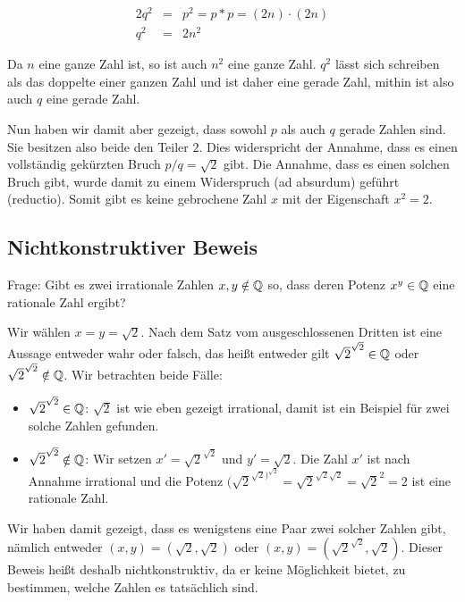 \begin{eqnarray}
	2q^2 & = & p^2 = p * p = (2n) \cdot (2n) \\
	q^2 & = & 2 n^2
\end{eqnarray}
	
Da $n$ eine ganze Zahl ist, so ist auch $n^2$ eine ganze Zahl. $q^2$ lässt sich schreiben als das doppelte einer ganzen Zahl und ist daher eine gerade Zahl, mithin ist also auch $q$ eine gerade Zahl.

Nun haben wir damit aber gezeigt, dass sowohl $p$ als auch $q$ gerade Zahlen sind. Sie besitzen also beide den Teiler $2$. Dies widerspricht der Annahme, dass es einen vollständig gekürzten Bruch $p / q = \sqrt{2}$ gibt. Die Annahme, dass es einen solchen Bruch gibt, wurde damit zu einem Widerspruch (ad absurdum) geführt (reductio). Somit gibt es keine gebrochene Zahl $x$ mit der Eigenschaft $x^2=2$.

\subsection{Nichtkonstruktiver Beweis}

Frage: Gibt es zwei irrationale Zahlen $x,y\notin \mathbb{Q}$ so, dass deren Potenz $x^y\in \mathbb{Q}$ eine rationale Zahl ergibt?

Wir wählen $x=y=\sqrt{2}$. Nach dem Satz vom ausgeschlossenen Dritten ist eine Aussage entweder wahr oder falsch, das heißt entweder gilt $\sqrt{2}^{\sqrt{2}} \in \mathbb{Q}$ oder $\sqrt{2}^{\sqrt{2}}\notin\mathbb{Q}$. Wir betrachten beide Fälle:

\begin{itemize}
	\item $\sqrt{2}^{\sqrt{2}}\in\mathbb{Q}$: $\sqrt{2}$ ist wie eben gezeigt irrational, damit ist ein Beispiel für zwei solche Zahlen gefunden.

	\item $\sqrt{2}^{\sqrt{2}}\notin\mathbb{Q}$: Wir setzen $x' = \sqrt{2}^{\sqrt{2}}$ und $y'=\sqrt{2}$. Die Zahl $x'$ ist nach Annahme irrational und die Potenz $(\sqrt{2}^{\sqrt{2})^{\sqrt{2}}} = \sqrt{2}^{\sqrt{2}\sqrt{2}} = \sqrt{2}^2 = 2$ ist eine rationale Zahl.
\end{itemize}

Wir haben damit gezeigt, dass es wenigstens eine Paar zwei solcher Zahlen gibt, nämlich entweder $(x,y) = (\sqrt{2}, \sqrt{2})$ oder $(x,y) = (\sqrt{2}^{\sqrt{2}}, \sqrt{2})$. Dieser Beweis heißt deshalb nichtkonstruktiv, da er keine Möglichkeit bietet, zu bestimmen, welche Zahlen es tatsächlich sind.

